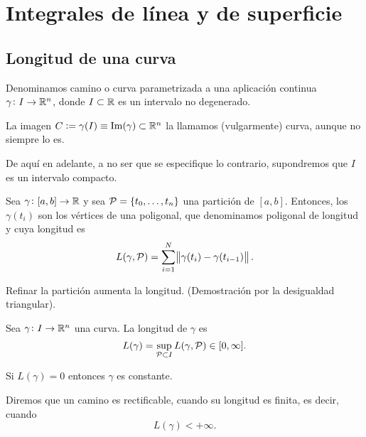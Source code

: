 \chapter{Integrales de línea y de superficie}

\section{Longitud de una curva}

\begin{defi}
    Denominamos camino o curva parametrizada a una aplicación continua $\gamma \colon I \to \mathbb{R}^n$, donde
    $I \subset \mathbb{R}$ es un intervalo no degenerado.

    La imagen $C := \gamma(I) \equiv \operatorname{Im}(\gamma) \subset \mathbb{R}^n$ la llamamos (vulgarmente) curva, aunque no
    siempre lo es.
\end{defi}

\begin{obs*}
    De aquí en adelante, a no ser que se especifique lo contrario, supondremos que $I$ es un intervalo compacto.
\end{obs*}

\begin{defi}
    Sea $\gamma \colon [a, b] \to \mathbb{R}$ y  sea $\mathcal{P} = \left\{t_0, \dots, t_n\right\}$ una partición de $[a, b]$.
    Entonces, los $\gamma(t_i)$ son los v\'ertices de una poligonal, que denominamos poligonal de longitud y cuya longitud es
    \[
        L(\gamma, \mathcal{P}) = \sum^N_{i=1} \norm{\gamma(t_i) - \gamma(t_{i-1})}.
    \]
\end{defi}
\begin{obs*}
    Refinar la partición aumenta la longitud. (Demostración por la desigualdad triangular).
\end{obs*}

\begin{defi}
    Sea $\gamma \colon I \to \mathbb{R}^n$ una curva. La longitud de $\gamma$ es
    \[
        L(\gamma) = \sup_{\mathcal{P} \subset I} L(\gamma, \mathcal{P}) \in [0, \infty].
    \]
\end{defi}

\begin{obs*}
    Si $L(\gamma) = 0$ entonces $\gamma$ es constante.
\end{obs*}

\begin{defi}
    Diremos que un camino es rectificable, cuando su longitud es finita, es decir, cuando
    \[
        L(\gamma) < +\infty.
    \]
\end{defi}

